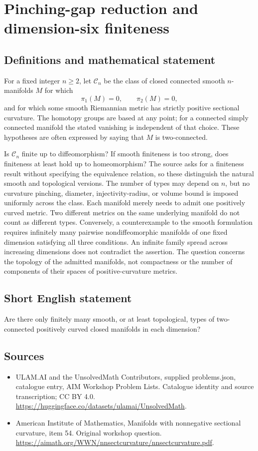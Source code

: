 \documentclass[11pt,a4paper]{article}
\begin{document}
\section*{Pinching-gap reduction and dimension-six finiteness}\label{statement}

\subsection{Definitions and mathematical statement}
For a fixed integer $n\geq2$, let $\mathcal C_n$ be the class of closed connected smooth $n$-manifolds $M$ for which
\[
 \pi_1(M)=0,\qquad \pi_2(M)=0,
\]
and for which some smooth Riemannian metric has strictly positive sectional curvature.
The homotopy groups are based at any point; for a connected simply connected manifold the stated vanishing is independent of that choice.
These hypotheses are often expressed by saying that $M$ is two-connected.

Is $\mathcal C_n$ finite up to diffeomorphism?
If smooth finiteness is too strong, does finiteness at least hold up to homeomorphism?
The source asks for a finiteness result without specifying the equivalence relation, so these distinguish the natural smooth and topological versions.
The number of types may depend on $n$, but no curvature pinching, diameter, injectivity-radius, or volume bound is imposed uniformly across the class.
Each manifold merely needs to admit one positively curved metric.
Two different metrics on the same underlying manifold do not count as different types.
Conversely, a counterexample to the smooth formulation requires infinitely many pairwise nondiffeomorphic manifolds of one fixed dimension satisfying all three conditions.
An infinite family spread across increasing dimensions does not contradict the assertion.
The question concerns the topology of the admitted manifolds, not compactness or the number of components of their spaces of positive-curvature metrics.
\subsection{Short English statement}
Are there only finitely many smooth, or at least topological, types of two-connected positively curved closed manifolds in each dimension?
\subsection{Sources}
\begin{itemize}
\item[S1] ULAM.AI and the UnsolvedMath Contributors, supplied problems.json, catalogue entry, AIM Workshop Problem Lists. Catalogue identity and source transcription; CC BY 4.0.
\url{https://huggingface.co/datasets/ulamai/UnsolvedMath}.
\item[S2] American Institute of Mathematics, Manifolds with nonnegative sectional curvature, item 54. Original workshop question.
\url{https://aimath.org/WWN/nnsectcurvature/nnsectcurvature.pdf}.
\end{itemize}
\end{document}

